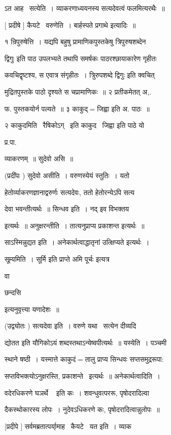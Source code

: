 \documentclass[11pt, openany]{book}
\begin{document}
ऽत आह \textendash\ सत्येति~। व्याकरणाध्ययनस्य सत्यदेवत्वं फलमित्यरथैः~॥ 

[ प्रदीषे ] कैयटे \textendash\ वरुणेति~। बार्हस्पते प्रगाथे इत्यादिः~॥ 

१ न्रिपुरुषेत्ति~। यद्यपि बहुषु प्रामाणिकपुस्तकेषु {\qt त्रिपुरुषशब्देन} 

द्विगुः इति पाठ उपलभ्यते तथापि समर्षकः पाठरश्छायाकारेण गृहीतः 

कवचिद्वृष्टश्य, स एवात्र संगृहीतः~। {\qt त्रिुरुपशब्दे द्विगुः} इति क्वचित्


मुद्रितपुस्तके पाठो दृश्यते स चप्रामाणिकः~॥ २ प्रतीकमेतत् अ,. 

फ. पुस्तकयोर्न पल्यते~॥ ३ {\qt काकुद्$=$जिह्वा} इति अ. पाठः~॥ 

२ काकुदमिति \textendash\ रैषिकोऽग् \textendash\ इति काकुद \textendash\ जिह्वा इति पाठे यो \textendash\ 

प्र.पा.

व्याकरणम्~॥ सुदेवो असि~॥ 

(प्रदींपः ) सुदेवो असीति~। वरुणस्येयं स्तुतिः~। यतो 

हेतोर्व्याकरणज्ञानाद्वरुर्णः सत्यदेवः, ततो हेतोरन्येऽपि सत्य \textendash\ 

देवा भवन्तीत्यर्थः~॥ सिन्धव इति~। नद् इव विभक्तय 

इत्यर्थः~॥ अनुक्षरन्तीति~। तात्यनुप्राप्य प्रकाशन्त इत्यर्थः~॥ 

साऽस्मिन्नुद्यत इति~। {\qt अनेकार्थत्वाद्धातृनां उत्क्षिप्यते} इत्यर्थः~। 

सूम्र्यमिति~। सूर्मि इति प्राप्ते {\qt अमि पूर्चः} इत्यत्र {\qt वा 

छन्दसि} इत्यनुवृत्त्या यणादेशः~॥ 

(उद्व्योतः ) सत्यदेवा इति~। वरुणे यथा \textendash\ सत्येन दीव्यदि 

द्योतत इति यौगिकोऽयं शब्दस्तथाऽन्येष्वपीत्यर्थः~॥ यस्येति~। पञ्चमी \textendash\ 

स्थाने षष्ठी~। यस्मात्ते काकुदं$=$तालु प्राप्य सिन्धवः सप्तसमुद्ररूपा: 

सप्तविभक्त्योऽनुक्षरस्ति, प्रकाशन्ते \textendash\ इत्यर्थः~॥ अनेकार्थत्वादिति~। 

वदेरधिकरणे {\qt घञर्थे \textendash\ } इति कः~। शवन्धुवत्पररू, पृषोदरादिल्वा \textendash\ 

दैकस्थोकारस्य लोपः~। नुदेवऽधिकरणे कः, पृषोदरादित्वान्नुलोपः~॥ 



[प्रदीपे ] सर्वमब्रतात्पर्या्माह \textendash\ कैयटे \textendash\ यत इति~। व्याक \textendash\ 
\end{document}
